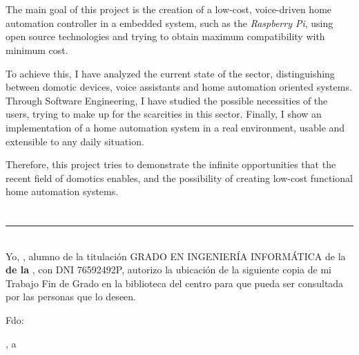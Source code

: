 \\

\vspace{0.7cm}
\\

The main goal of this project is the creation of a low-cost, voice-driven home automation controller in a embedded system, such 
as the \textit{Raspberry Pi}, using open source technologies and trying to obtain maximum compatibility with minimum cost.

\bigskip
To achieve this, I have analyzed the current state of the sector, distinguishing between domotic devices, voice assistants
and home automation oriented systems. Through Software Engineering, I have studied the possible necessities of the users, trying
to make up for the scarcities in this sector. Finally, I show an implementation of a home automation system in a real environment,
usable and extensible to any daily situation.

\bigskip
Therefore, this project tries to demonstrate the infinite opportunities that the recent field of domotics enables, and the possibility
of creating low-cost functional home automation systems. 

\chapter*{}
\thispagestyle{empty}

\noindent\rule[-1ex]{\textwidth}{2pt}\\[4.5ex]

Yo, \textbf{\myName}, alumno de la titulación GRADO EN INGENIERÍA INFORMÁTICA de la \textbf{\myFaculty de la \myUni}, 
con DNI 76592492P, autorizo la ubicación de la siguiente copia de mi Trabajo Fin de Grado en la biblioteca del centro 
para que pueda ser consultada por las personas que lo deseen.

\vspace{6cm}

\noindent Fdo: \myName

\vspace{2cm}

\begin{flushright}
\myLocation, a \myTimeES
\end{flushright}


\chapter*{}
\thispagestyle{empty}

